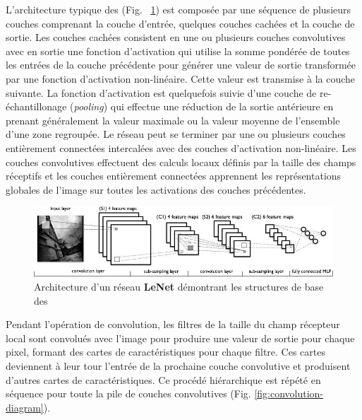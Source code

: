 L’architecture typique des \acrconvnet (Fig. ~\ref{fig:convnet-lenet-diagram}) est composée par une séquence de plusieurs couches comprenant la couche d’entrée, quelques couches cachées et la couche de sortie.  Les couches cachées consistent en une ou plusieurs couches convolutives avec en sortie une fonction d’activation  qui utilise la somme pondérée de toutes les entrées de la couche précédente pour générer une valeur de sortie transformée par une fonction d'activation non-linéaire.  Cette valeur est transmise à la couche suivante. La fonction d'activation est quelquefois suivie d’une couche de re-échantillonage (\textit{pooling}) qui effectue une réduction de la sortie antérieure en prenant généralement la valeur maximale ou la valeur moyenne de l'ensemble d'une zone regroupée. Le réseau peut se terminer par une ou plusieurs couches entièrement connectées intercalées avec des couches d’activation non-linéaire. Les couches convolutives effectuent des calculs locaux définis par la taille des champs réceptifs et les couches entièrement connectées apprennent les représentations globales de l'image sur toutes les activations des couches précédentes. 

\begin{figure}[!htbp] 
  \includegraphics[width=\linewidth]{figures/convnet-lenet-diagram.jpg}
   \caption{\small{Architecture d'un réseau \textbf{LeNet} démontrant les structures de base des \acrconvnet}}
  \label{fig:convnet-lenet-diagram}
\end{figure}

Pendant l’opération de convolution, les filtres de la taille du champ récepteur local sont convolués avec l’image pour produire une valeur de sortie pour chaque pixel, formant des cartes de caractéristiques pour chaque filtre.  Ces cartes deviennent à leur tour l’entrée de la prochaine couche convolutive et produisent d’autres cartes de caractéristiques.  Ce procédé hiérarchique est répété en séquence pour toute la pile de couches convolutives (Fig. \ref{fig:convolution-diagram}).

